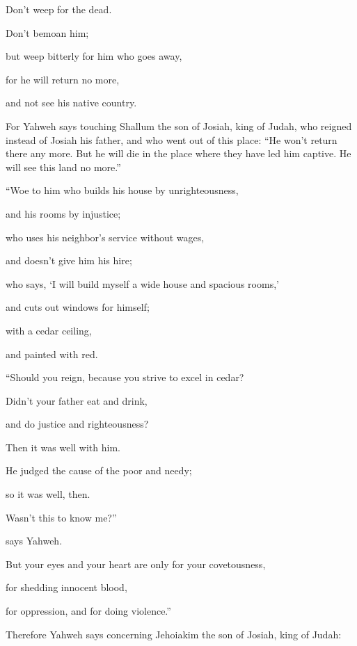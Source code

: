 {\par }{\Q {}Don’t weep for the dead.
\par }{\QB Don’t bemoan him;
\par }{\Q but weep bitterly for him who goes away,
\par }{\QB for he will return no more,
\par }{\QB and not see his native country.
\par }{\MM {}For Yahweh says touching Shallum the son of Josiah, king of Judah, who reigned instead of Josiah his father, and who went out of this place: “He won’t return there any more.
But he will die in the place where they have led him captive. He will see this land no more.”
\par }{\Q {}“Woe to him who builds his house by unrighteousness,
\par }{\QB and his rooms by injustice;
\par }{\Q who uses his neighbor’s service without wages,
\par }{\QB and doesn’t give him his hire;
\par }{\Q {}who says, ‘I will build myself a wide house and spacious rooms,’
\par }{\QB and cuts out windows for himself;
\par }{\Q with a cedar ceiling,
\par }{\QB and painted with red.
\par }{\BB \par }{\Q {}“Should you reign, because you strive to excel in cedar?
\par }{\QB Didn’t your father eat and drink,
\par }{\QB and do justice and righteousness?
\par }{\QB Then it was well with him.
\par }{\Q {}He judged the cause of the poor and needy;
\par }{\QB so it was well, then.
\par }{\Q Wasn’t this to know me?”
\par }{\QB says Yahweh.
\par }{\Q {}But your eyes and your heart are only for your covetousness,
\par }{\QB for shedding innocent blood,
\par }{\QB for oppression, and for doing violence.”
\par }{\MM {}Therefore Yahweh says concerning Jehoiakim the son of Josiah, king of Judah:
}
